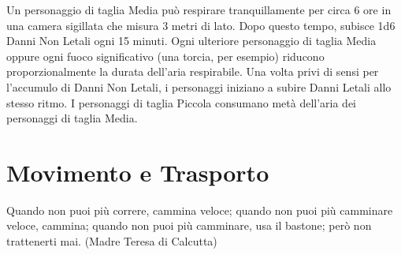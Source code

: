 \documentclass[12pt,a4paper,twoside,openany]{book}
\begin{document}
\begin{multicols}{2}
Un personaggio di taglia Media può respirare tranquillamente per circa 6 ore in una camera sigillata che misura 3 metri di lato. Dopo questo tempo, subisce 1d6 Danni Non Letali ogni 15 minuti. Ogni ulteriore personaggio di taglia Media oppure ogni fuoco significativo (una torcia, per esempio) riducono proporzionalmente la durata dell'aria respirabile. Una volta privi di sensi per l'accumulo di Danni Non Letali, i personaggi iniziano a subire Danni Letali allo stesso ritmo. I personaggi di taglia Piccola consumano metà dell'aria dei personaggi di taglia Media.

\end{multicols}

\pagebreak

\section{Movimento e Trasporto}

\label{movimento-e-trasporto}

\begin{changemargin}{0.3cm}{0.3cm}\begin{enfasi}{
Quando non puoi più correre, cammina veloce; quando non puoi più camminare veloce, cammina; quando non puoi più camminare, usa il bastone; però non trattenerti mai. (Madre Teresa di Calcutta)}
\end{enfasi}\end{changemargin}\medskip
\end{document}
